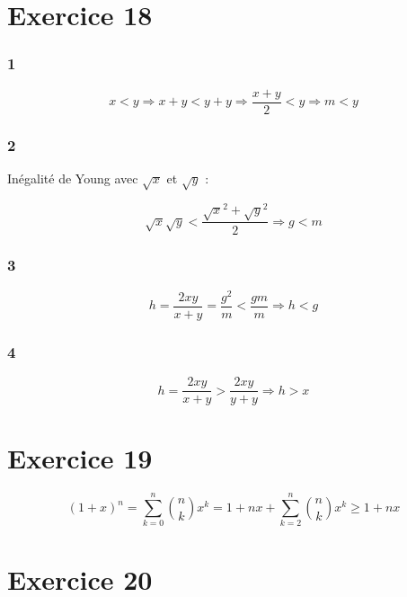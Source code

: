 \documentclass{report}
\begin{document}
\section*{Exercice 18}

\subsubsection*{1}

\begin{displaymath}
	x < y \Rightarrow x + y < y + y \Rightarrow \frac{x+y}{2} < y \Rightarrow m <y
\end{displaymath}

\subsubsection*{2}

Inégalité de Young avec $\sqrt{x}$ et $\sqrt{y}$ :

\begin{displaymath}
	\sqrt{x} \sqrt{y} < \frac{\sqrt{x}^2 + \sqrt{y}^2}{2} \Rightarrow g<m
\end{displaymath}

\subsubsection*{3}

\begin{displaymath}
	h = \frac{2xy}{x+y} = \frac{g^2}{m} < \frac{gm}{m} \Rightarrow h < g
\end{displaymath}

\subsubsection*{4}

\begin{displaymath}
	h = \frac{2xy}{x+y} > \frac{2xy}{y+y} \Rightarrow h > x
\end{displaymath}

\section*{Exercice 19}
\begin{displaymath}
	(1+x)^n = \sum_{k=0}^{n}\binom{n}{k}x^k = 1 + nx + \sum_{k=2}^{n}\binom{n}{k}x^k \geq 1 + nx
\end{displaymath}

\section*{Exercice 20}
\end{document}
